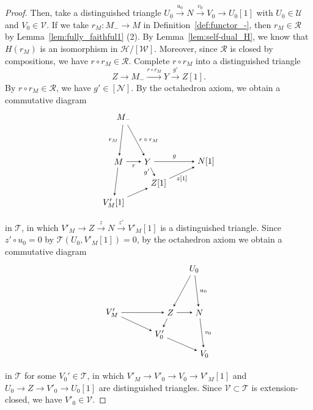 \documentclass[a4paper,reqno,10pt]{amsart}
\DeclareRobustCommand{\darkblueedit}[1]{#1}
\theoremstyle{definition}
\theoremstyle{definition}
\theoremstyle{definition}
\theoremstyle{definition}
\theoremstyle{plain}
\newcommand{\CH}{\mathcal{H}}
\newcommand{\CN}{\mathcal{N}}
\newcommand{\CR}{\mathcal{R}}
\newcommand{\CT}{\mathcal{T}}
\newcommand{\CU}{\mathcal{U}}
\newcommand{\CV}{\mathcal{V}}
\newcommand{\CW}{\mathcal{W}}
\begin{document}
\begin{proof}
Then, take a distinguished triangle $U_0\xrightarrow{u_0}N\xrightarrow{v_0}V_0\to U_0[1]$ with $U_0\in\CU$ and $V_0\in\CV$.
If we take $r_M\colon M_-\to M$ in Definition~\ref{def:functor_-}, then $r_M\in\CR$ by Lemma~\ref{lem:fully_faithful1} {\rm (2)}.
By Lemma~\ref{lem:self-dual_H}, we know that $H(r_M)$ is an isomorphism in $\CH/[\CW]$. Moreover, since $\CR$ is closed by compositions, we have $r\circ r_M\in\CR$. 
Complete $r\circ r_M$ into a distinguished triangle
\[
Z\to M_-\xrightarrow{r\circ r_M}Y\xrightarrow{g'}Z[1].
\]
By $r\circ r_M\in\CR$, we have $g'\in[\CN]$.
By the octahedron axiom, we obtain a commutative diagram
\[
\begin{tikzpicture}[>=stealth]
\node (1) at (-0.98,1.8) {$M_-$};
\node (2) at (-1.19,0) {$M$};
\node (3) at (-1.4,-1.7) {\darkblueedit{$V'_M[1]$}};
\node (4) at (0,0) {$Y$};
\node (5) at (0.45,-0.9) {$Z[1]$};
\node (6) at (2.4,0) {$N[1]$};
\draw[->] (1) -- node[left,font=\scriptsize] {$r_M$} (2);
\draw[->] (1) -- node[right,font=\scriptsize] {$r\circ r_M$} (4);
\draw[->] (2) -- (3);
\draw[->] (2) -- node[below,font=\scriptsize] {$r$} (4);
\draw[->] (3) -- (5);
\draw[->] (4) -- node[left,font=\scriptsize] {$g'$} (5);
\draw[->] (4) -- node[above,font=\scriptsize] {$g$} (6);
\draw[->] (5) -- node[below,font=\scriptsize] {$z[1]$} (6);
\end{tikzpicture}
\]
in $\CT$, in which $V'_M\to Z\xrightarrow{z}N\xrightarrow{z'}V'_M[1]$ is a distinguished triangle. Since $z'\circ u_0=0$ by $\CT(U_0,V'_M[1])=0$, by the octahedron axiom we obtain a commutative diagram
\[
\begin{tikzpicture}[>=stealth]
\node (1) at (0.98,1.8) {$U_0$};
\node (2) at (1.19,0) {$N$};
\node (3) at (1.4,-1.7) {$V_0$};
\node (4) at (0,0) {$Z$};
\node (5) at (-0.45,-0.9) {$V_0'$};
\node (6) at (-2.4,0) {$V'_M$};
\draw[->] (1) -- node[right,font=\scriptsize] {$u_0$} (2);
\draw[->] (1) -- node[right,font=\scriptsize] {} (4);
\draw[->] (2) -- node[right,font=\scriptsize] {$v_0$} (3);
\draw[->] (4) -- node[below,font=\scriptsize] {} (2);
\draw[->] (5) -- node[below,font=\scriptsize] {} (3);
\draw[->] (4) -- node[left,font=\scriptsize] {} (5);
\draw[->] (6) -- node[above,font=\scriptsize] {} (4);
\draw[->] (6) -- node[below,font=\scriptsize] {} (5);
\end{tikzpicture}
\]
in $\CT$ for some $V_0'\in \CT$, in which 
$V'_M\to V'_0\to V_0\to V'_M[1]$ and $U_0\to Z\to V'_0\to U_0[1]$ are distinguished triangles. Since $\CV\subset\CT$ is extension-closed, we have $V'_0\in\CV$.


\end{proof}
\end{document}
